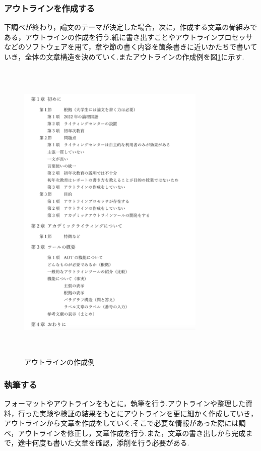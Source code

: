 \documentclass[a4j,12pt]{jarticle}
\begin{document}
\subsubsection{アウトラインを作成する}
下調べが終わり，論文のテーマが決定した場合，次に，作成する文章の骨組みである，アウトラインの作成を行う.紙に書き出すことやアウトラインプロセッサなどのソフトウェアを用て，章や節の書く内容を箇条書きに近いかたちで書いていき，全体の文章構造を決めていく.またアウトラインの作成例を図\ref{fig:a}に示す.
\begin{figure}[h]
\begin{center}
 \includegraphics[clip,width=90mm,height=150mm]{figure/outline2.png}
\end{center}
 \caption{アウトラインの作成例}
 \label{fig:a}
\end{figure}
\newpage
\subsubsection{執筆する}
フォーマットやアウトラインをもとに，執筆を行う.アウトラインや整理した資料，行った実験や検証の結果をもとにアウトラインを更に細かく作成していき，アウトラインから文章を作成をしていく.そこで必要な情報があった際には調べ，アウトラインを修正し，文章作成を行う.また，文章の書き出しから完成まで，途中何度も書いた文章を確認，添削を行う必要がある.
\newpage
\end{document}

